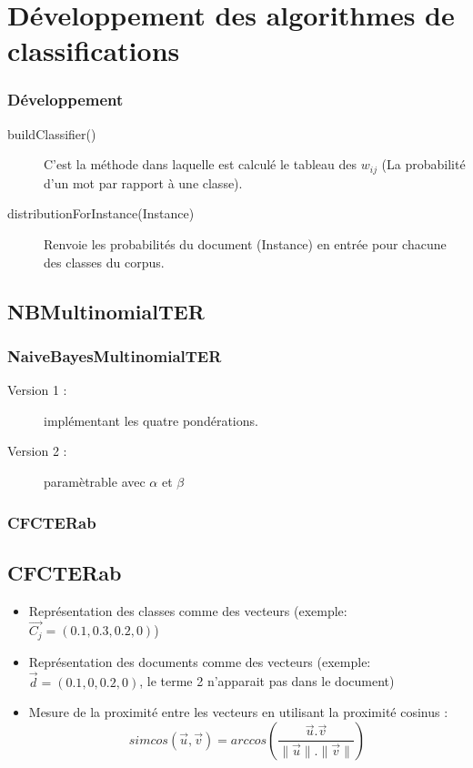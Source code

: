 \documentclass[12pt]{beamer}
\begin{document}
\section{Développement des algorithmes de classifications}
\begin{frame}
\frametitle{Développement}

\begin{description}
\item[buildClassifier()]  C'est la méthode dans laquelle est calculé le tableau des $w_{ij}$ (La probabilité d'un mot par rapport à une classe).
\item[distributionForInstance(Instance)] Renvoie les probabilités du document (Instance) en entrée pour chacune des classes du corpus.
\end{description}


\end{frame}



\subsection{NBMultinomialTER}
\begin{frame}
\frametitle{NaiveBayesMultinomialTER}

\begin{description}
\item[Version 1 : ]  implémentant les quatre pondérations.
\item[Version 2 : ] paramètrable avec $\alpha$ et $\beta$
\end{description}


\end{frame}

\begin{frame}
\frametitle{CFCTERab}
\subsection{CFCTERab}
\begin{itemize}
\item Représentation des classes comme des vecteurs (exemple: $\vec{C_j} = (0.1,0.3,0.2,0)$)
\item Représentation des documents comme des vecteurs (exemple: $\vec{d} = (0.1,0,0.2,0)$, le terme 2 n'apparait pas dans le document)
\item Mesure de la proximité entre les vecteurs en utilisant la proximité cosinus :
\[simcos(\vec{u},\vec{v}) = arccos( \frac{\vec{u}.\vec{v}}{\|\vec{u}\|.\|\vec{v}\|})\]
\end{itemize}



\end{frame}
\end{document}

